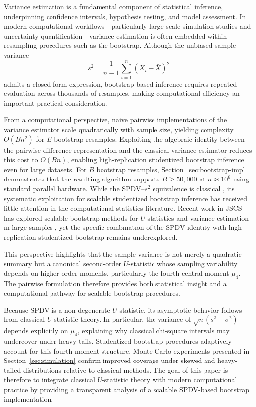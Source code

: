 \documentclass[12pt,a4paper]{article}
\begin{document}
Variance estimation is a fundamental component of statistical inference, underpinning confidence intervals, hypothesis testing, and model assessment. In modern computational workflows—particularly large-scale simulation studies and uncertainty quantification—variance estimation is often embedded within resampling procedures such as the bootstrap. Although the unbiased sample variance
\[
s^2 = \frac{1}{n-1}\sum_{i=1}^n (X_i-\bar X)^2
\]
admits a closed-form expression, bootstrap-based inference requires repeated evaluation across thousands of resamples, making computational efficiency an important practical consideration.

From a computational perspective, naive pairwise implementations of the variance estimator scale quadratically with sample size, yielding complexity $O(Bn^2)$ for $B$ bootstrap resamples. Exploiting the algebraic identity between the pairwise difference representation and the classical variance estimator reduces this cost to $O(Bn)$, enabling high-replication studentized bootstrap inference even for large datasets. For $B$ bootstrap resamples, Section~\ref{sec:bootstrap-impl} demonstrates that the resulting algorithm supports $B \ge 50{,}000$ at $n \approx 10^6$ using standard parallel hardware. While the SPDV--$s^2$ equivalence is classical \citep{serfling1980,lee1990}, its systematic exploitation for scalable studentized bootstrap inference has received little attention in the computational statistics literature. Recent work in JSCS has explored scalable bootstrap methods for $U$-statistics and variance estimation in large samples \citep{chen2023scalable,liu2022parallel}, yet the specific combination of the SPDV identity with high-replication studentized bootstrap remains underexplored.

This perspective highlights that the sample variance is not merely a quadratic summary but a canonical second-order $U$-statistic whose sampling variability depends on higher-order moments, particularly the fourth central moment $\mu_4$. The pairwise formulation therefore provides both statistical insight and a computational pathway for scalable bootstrap procedures.

Because SPDV is a non-degenerate $U$-statistic, its asymptotic behavior follows from classical $U$-statistic theory. In particular, the variance of $\sqrt{n}(s^2-\sigma^2)$ depends explicitly on $\mu_4$, explaining why classical chi-square intervals may undercover under heavy tails. Studentized bootstrap procedures adaptively account for this fourth-moment structure. Monte Carlo experiments presented in Section~\ref{sec:simulation} confirm improved coverage under skewed and heavy-tailed distributions relative to classical methods. The goal of this paper is therefore to integrate classical $U$-statistic theory with modern computational practice by providing a transparent analysis of a scalable SPDV-based bootstrap implementation.
\end{document}

